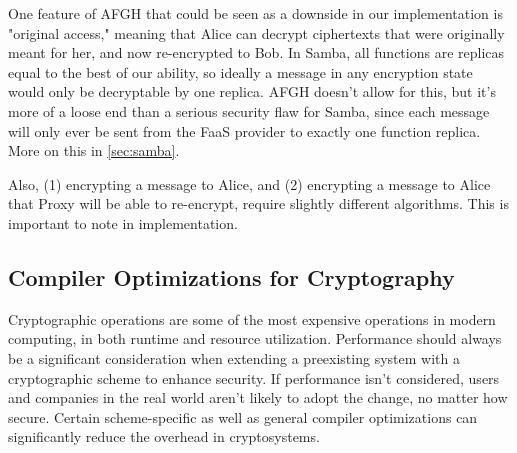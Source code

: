 One feature of AFGH that could be seen as a downside in our implementation is "original access," meaning that Alice can decrypt ciphertexts that were originally meant for her, and now re-encrypted to Bob.
In Samba, all functions are replicas equal to the best of our ability, so ideally a message in any encryption state would only be decryptable by one replica.
AFGH doesn't allow for this, but it's more of a loose end than a serious security flaw for Samba, since each message will only ever be sent from the FaaS provider to exactly one function replica. 
More on this in \ref{sec:samba}.

Also, (1) encrypting a message to Alice, and (2) encrypting a message to Alice that Proxy will be able to re-encrypt, require slightly different algorithms. 
This is important to note in implementation.


\subsection{Compiler Optimizations for Cryptography}
\label{sec:optimization_background}

Cryptographic operations are some of the most expensive operations in modern computing, in both runtime and resource utilization.
Performance should always be a significant consideration when extending a preexisting system with a cryptographic scheme to enhance security.
If performance isn't considered, users and companies in the real world aren't likely to adopt the change, no matter how secure. Certain scheme-specific as well as general compiler optimizations can significantly reduce the overhead in cryptosystems.
